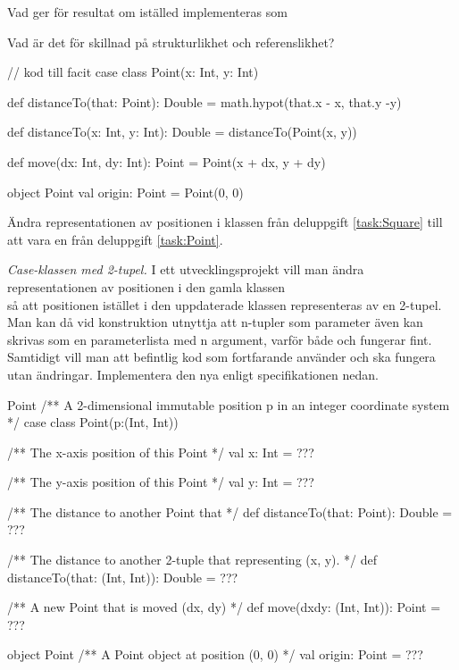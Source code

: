 \Subtask Vad ger  för resultat om  iställed  implementeras som 

\Subtask\Pen Vad är det för skillnad på strukturlikhet och referenslikhet?

\begin{CodeSmall}
// kod till facit
case class Point(x: Int, y: Int) {
  def distanceTo(that: Point): Double = math.hypot(that.x - x, that.y -y)
  
  def distanceTo(x: Int, y: Int): Double = distanceTo(Point(x, y)) 
  
  def move(dx: Int, dy: Int): Point = Point(x + dx, y + dy)
}

object Point {
  val origin: Point = Point(0, 0)
}
\end{CodeSmall}


\Task Ändra representationen av positionen i klassen  från deluppgift \ref{task:Square} till att vara en  från deluppgift \ref{task:Point}.


\Task \label{task:PointTuple} \emph{Case-klassen  med 2-tupel.} I ett utvecklingsprojekt vill man ändra representationen av positionen i den gamla klassen  \\  så att positionen istället i den uppdaterade klassen representeras av en 2-tupel. Man kan då vid konstruktion utnyttja att n-tupler som parameter även kan skrivas som en parameterlista med n argument, varför både  och  fungerar fint. Samtidigt vill man att befintlig kod som fortfarande använder  och  ska fungera utan ändringar.  Implementera den nya  enligt specifikationen nedan. 
\begin{ScalaSpec}{Point}
/** A 2-dimensional immutable position p in an integer coordinate system */ 
case class Point(p:(Int, Int)) {
  /** The x-axis position of this Point */
  val x: Int = ???

  /** The y-axis position of this Point */
  val y: Int = ???

  /** The distance to another Point that */
  def distanceTo(that: Point): Double = ???

  /** The distance to another 2-tuple that representing (x, y). */
  def distanceTo(that: (Int, Int)): Double = ???

  /** A new Point that is moved (dx, dy) */
  def move(dxdy: (Int, Int)): Point = ???
}

object Point {
  /** A Point object at position (0, 0) */ 
  val origin: Point = ???
}
\end{ScalaSpec}

